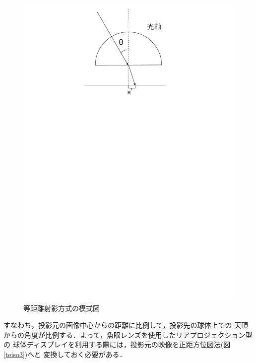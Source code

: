 \begin{figure}[tbp]
  \centering
  \includegraphics[scale=0.7]{fig/projection2.pdf}
  \caption{等距離射影方式の模式図}\label{pro}
\end{figure}

すなわち，投影元の画像中心からの距離に比例して，投影先の球体上での
天頂からの角度が比例する．よって，魚眼レンズを使用したリアプロジェクション型の
球体ディスプレイを利用する際には，投影元の映像を正距方位図法(図\ref{teiso3})へと
変換しておく必要がある．

